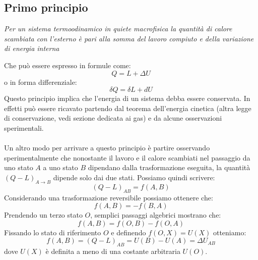 \documentclass{article}
\begin{document}
\subsection{Primo principio}
\begin{center}
    \textit{Per un sistema termoodinamico in quiete macrofisica la quantità di calore scambiata con l'esterno è pari alla somma del lavoro compiuto e della variazione di energia interna}
\end{center}
Che può essere espresso in formule come:
$$ Q=L+\Delta U $$
o in forma differenziale:
$$ \delta Q=\delta L + dU $$
Questo principio implica che l'energia di un sistema debba essere conservata. In effetti può essere ricavato partendo dal teorema dell'energia cinetica (altra legge di conservazione, vedi sezione dedicata ai gas) e da alcune osservazioni sperimentali.\\\\
Un altro modo per arrivare a questo principio è partire osservando sperimentalmente che nonostante il lavoro e il calore scambiati nel passaggio da uno stato $A$ a uno stato $B$ dipendano dalla trasformazione eseguita, la quantità $(Q-L)_{A\rightarrow B}$ dipende solo dai due stati. Possiamo quindi scrivere:
$$ (Q-L)_{AB} = f(A, B) $$
Considerando una trasformazione reversibile possiamo ottenere che:
$$ f(A,B)=-f(B,A) $$
Prendendo un terzo stato $O$, semplici passaggi algebrici mostrano che:
$$ f(A,B)=f(O,B)-f(O, A) $$
Fissando lo stato di riferimento $O$ e definendo $f(O,X)=U(X)$ otteniamo:
$$ f(A,B)=(Q-L)_{AB}=U(B)-U(A)=\Delta U_{AB} $$
dove $U(X)$ è definita a meno di una costante arbitraria $U(O)$.

















\Index
\end{document}
